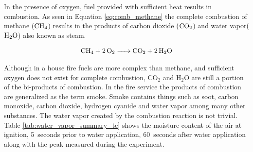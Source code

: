 \documentclass[12pt,oneside]{book}
\begin{document}

In the presence of oxygen, fuel provided with sufficient heat results in combustion. As seen in Equation \ref{eq:comb_methane} the complete combustion of methane ($\ce{CH4}$) results in the products of carbon dioxide ($\ce{CO2}$) and water vapor($\ce{H2O}$) also known as steam. 

\begin{equation}
\ce{CH4 + 2O2 -> CO2 + 2H2O}
\label{eq:comb_methane}
\end{equation}

Although in a house fire fuels are more complex than methane, and sufficient oxygen does not exist for complete combustion, CO$_2$ and H$_2$O are still a portion of the bi-products of combustion. In the fire service the products of combustion are generalized as the term smoke. Smoke contains things such as soot, carbon monoxide, carbon dioxide, hydrogen cyanide and water vapor among many other substances. The water vapor created by the combustion reaction is not trivial. Table \ref{tab:water_vapor_summary_tc} shows the moisture content of the air at ignition, 5~seconds prior to water application, 60~seconds after water application along with the peak measured during the experiment. 
\end{document}
